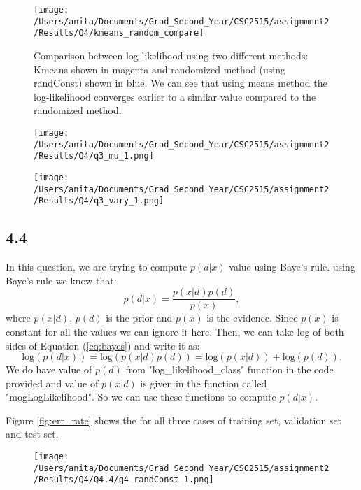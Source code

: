 \documentclass[10pt]{article}
\begin{document}
\begin{figure}[H]
	\centering
	\texttt{[image: /Users/anita/Documents/Grad\_Second\_Year/CSC2515/assignment2/Results/Q4/kmeans\_random\_compare]}
	\caption{Comparison between log-likelihood using two different methods: Kmeans shown in magenta and randomized method (using randConst) shown in blue.
	We can see that using means method the log-likelihood converges earlier to a similar value compared to the randomized method.}
	\label{fig:q4.3_logL}
\end{figure}


\begin{figure}[H]
	\centering
	\texttt{[image: /Users/anita/Documents/Grad\_Second\_Year/CSC2515/assignment2/Results/Q4/q3\_mu\_1.png]}
	\caption{}
	\label{fig:q4.3_mu}
\end{figure}


\begin{figure}[H]
	\centering
	\texttt{[image: /Users/anita/Documents/Grad\_Second\_Year/CSC2515/assignment2/Results/Q4/q3\_vary\_1.png]}
	\caption{}
	\label{fig:q4.3_mu}
\end{figure}

\subsection*{4.4}
In this question, we are trying to compute $p(d|x)$ value using Baye's rule. using Baye's rule we know that:
\begin{equation}\label{eq:bayes}
p(d|x) = \frac{p(x|d) p(d)}{p(x)},
\end{equation}
where $p(x|d)$, $p(d)$ is the prior and $p(x)$ is the evidence. Since $p(x)$ is constant for all the values we can ignore it here. Then, we can take log of both sides of Equation (\ref{eq:bayes}) and write it as:
\begin{equation}
\mathrm{log} (p(d|x)) = \mathrm{log}(p(x|d) p(d)) = \mathrm{log}(p(x|d)) + \mathrm{log}(p(d)).
\end{equation} 
We do have value of $p(d)$ from "log\_likelihood\_class" function in the code provided and value of $p(x|d)$ is given in the function called "mogLogLikelihood". So we can use these functions to compute $p(d|x)$.

Figure \ref{fig:err_rate} shows the for all three cases of training set, validation set and test set.
\begin{figure}[H]
	\centering
	\texttt{[image: /Users/anita/Documents/Grad\_Second\_Year/CSC2515/assignment2/Results/Q4/Q4.4/q4\_randConst\_1.png]}
	\caption{}
	\label{fig:4.4}
\end{figure}
\end{document}
